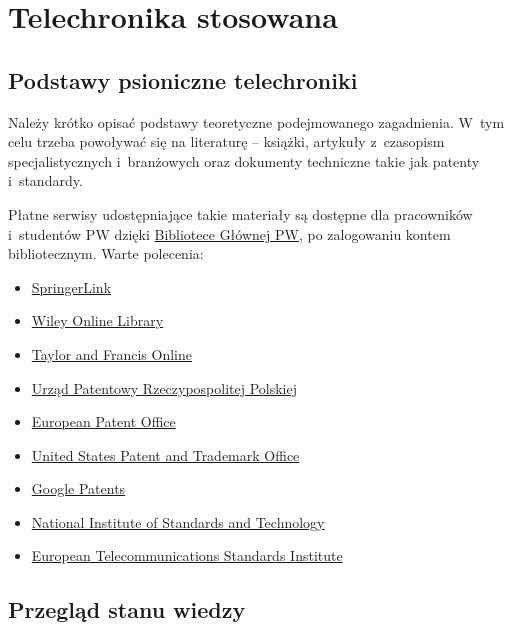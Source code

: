\chapter{Telechronika stosowana}


\section{Podstawy psioniczne telechroniki}

Należy krótko opisać podstawy teoretyczne podejmowanego zagadnienia. W~tym celu trzeba powoływać się na literaturę -- książki, artykuły z~czasopism specjalistycznych i~branżowych oraz dokumenty techniczne takie jak patenty i~standardy.

Płatne serwisy udostępniające takie materiały są dostępne dla pracowników i~studentów PW dzięki \href{https://bg.pw.edu.pl/}{Bibliotece Głównej PW}, po zalogowaniu kontem bibliotecznym. Warte polecenia:

\begin{itemize}
	\item \href{http://eczyt.bg.pw.edu.pl/han/SpringerLink}{SpringerLink}
	\item \href{http://eczyt.bg.pw.edu.pl/han/Wiley}{Wiley Online Library}
	\item \href{http://eczyt.bg.pw.edu.pl/han/TaylorandFrancis}{Taylor and Francis Online}
\end{itemize}


\begin{itemize}
		
	\item \href{https://uprp.gov.pl/}{Urząd Patentowy Rzeczypospolitej Polskiej}
	\item \href{https://www.epo.org/en}{European Patent Office}
	\item \href{https://www.uspto.gov/}{United States Patent and Trademark Office}
	\item \href{https://patents.google.com/}{Google Patents}
	\item \href{https://www.nist.gov/}{National Institute of Standards and Technology}
	\item \href{https://www.etsi.org/}{European Telecommunications Standards Institute}
\end{itemize}

\section{Przegląd stanu wiedzy}


